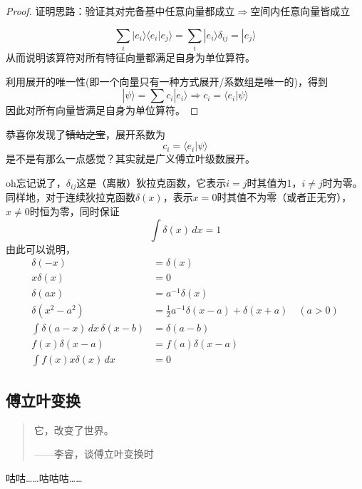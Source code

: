 \documentclass{article}
\newtheorem{proof}{Proof}[section]
\numberwithin{equation}{section}
\newcommand{\ket}[1]{| #1 \rangle}
\newcommand{\bracket}[2]{\langle #1 | #2 \rangle}
\begin{document}
    \begin{proof}
    	证明思路：验证其对完备基中任意向量都成立$\Rightarrow$空间内任意向量皆成立

\begin{equation}
	\sum_i \ket{e_i}\bracket{e_i}{e_j} = \sum_i\ket{e_i} \delta_{ij} = \ket{e_j}
\end{equation}
从而说明该算符对所有特征向量都满足自身为单位算符。

利用展开的唯一性(即一个向量只有一种方式展开/系数组是唯一的)，得到
\begin{equation}
\ket{\psi} = \sum c_i \ket{e_i} \Rightarrow c_i = \bracket{e_i}{\psi}
\end{equation}
因此对所有向量皆满足自身为单位算符。
    \end{proof}
    恭喜你发现了\sout{镇站之宝}，展开系数为
    \begin{equation}
    	c_i = \langle e_i | \psi \rangle 
    \end{equation}
    是不是有那么一点感觉？其实就是广义傅立叶级数展开。

    oh忘记说了，$\delta_{ij}$这是（离散）狄拉克函数，它表示$i=j$时其值为1，$i\neq j$时为零。同样地，对于连续狄拉克函数$\delta(x)$，表示$x=0$时其值不为零（或者正无穷），$x\neq 0$时恒为零，同时保证
    \begin{equation}
	    \int \delta(x) \, dx = 1 
    \end{equation}
    由此可以说明，
    \begin{align}
\delta(-x) & = \delta(x) \\
x\delta(x) & = 0 \\
\delta(a x) & = a^{-1} \delta(x)\\
\delta(x^2-a^2) & = \frac{1}{2} a^{-1} {\delta(x-a)+\delta(x+a)} \quad (a>0)\\
\int \delta(a-x) \, dx \, \delta(x-b) & = \delta(a-b) \\
f(x) \delta(x-a) &=  f(a)\delta(x-a)\\
\int f(x)x\delta(x) \, dx & = 0
\end{align}

    \subsection{傅立叶变换}
  \begin{quote}
    它，改变了世界。
    \begin{flushright}
      ——李睿，谈傅立叶变换时
    \end{flushright}
  \end{quote}     
  咕咕……咕咕咕……
\end{document}

